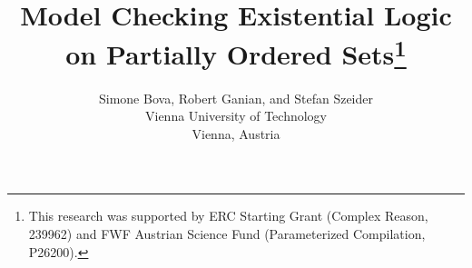\documentclass[usletter]{article}
\newcommand{\longversion}[1]{#1}
\newcommand{\shortversion}[1]{}
\newcommand{\longshort}[2]{\longversion{#1}\shortversion{#2}}
\begin{document}
\shortversion{
\special{papersize=8.5in,11in}
\setlength{\pdfpageheight}{\paperheight}
\setlength{\pdfpagewidth}{\paperwidth}

\conferenceinfo{CSL-LICS 2014}{July 14--18, 2014, Vienna, Austria}
\copyrightyear{2014}
\copyrightdata{978-1-4503-2886-9}
\doi{nnnnnnn.nnnnnnn}









\titlebanner{banner above paper title}        \preprintfooter{short description of paper}   }

\title{Model Checking Existential Logic on Partially Ordered Sets\footnote{This research was supported by ERC Starting Grant (Complex Reason, 239962) 
and FWF Austrian Science Fund (Parameterized Compilation, P26200).}}


\longshort{
\newcommand*\samethanks[1][\value{footnote}]{\footnotemark[#1]}
\author{Simone Bova, Robert Ganian, and Stefan Szeider\\
\small Vienna University of Technology\\[-3pt]
\small  Vienna, Austria}

\date{}

}
{
\authorinfo{Simone Bova, Robert Ganian, and Stefan Szeider}
           {Vienna University of Technology (Vienna, Austria)}}


\maketitle
\end{document}
